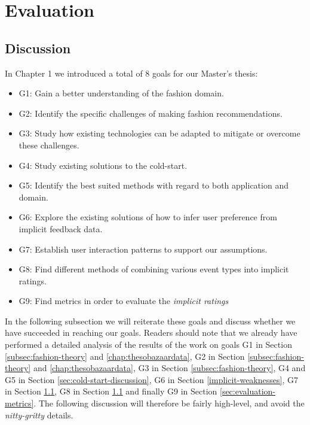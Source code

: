 
\chapter{Evaluation}
\label{chap:resulteval}
\minitoc


\clearpage






\section{Discussion}

In Chapter 1 we introduced a total of 8 goals for our Master's thesis:

\begin{itemize}
\item G1: Gain a better understanding of the fashion domain.
\item G2: Identify the specific challenges of making fashion recommendations.
\item G3: Study how existing technologies can be adapted to mitigate or
  		  overcome these challenges.
\item G4: Study existing solutions to the cold-start.
\item G5: Identify the best suited methods with regard to both application and domain.
\item G6: Explore the existing solutions of how to infer user preference from implicit feedback data.
\item G7: Establish user interaction patterns to support our assumptions.
\item G8: Find different methods of combining various event types into implicit ratings.
\item G9: Find metrics in order to evaluate the \emph{implicit ratings}
\end{itemize}

In the following subsection we will reiterate these goals and discuss whether we have succeeded in reaching our goals. Readers should
note that we already have performed a detailed analysis of the results of the work on goals G1 in Section \ref{subsec:fashion-theory} and \ref{chap:thesobazaardata},
G2 in Section \ref{subsec:fashion-theory} and \ref{chap:thesobazaardata}, G3 in Section \ref{subsec:fashion-theory}, G4 and G5 in Section \ref{sec:cold-start-discussion}, G6 in Section \ref{implicit-weaknesses},
G7 in Section \ref{}, G8 in Section \ref{} and finally G9 in Section \ref{sec:evaluation-metrics}.
The following discussion will therefore be fairly high-level, and avoid the \emph{nitty-gritty} details.

